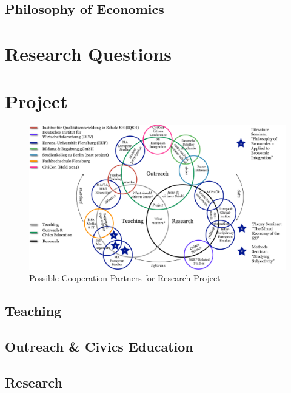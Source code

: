 \documentclass[11pt,a4paper,oneside,english]{article}
\begin{document}
\subsection[Philosophy of Economics]{Philosophy of Economics} \label{sec:philosophy-economics}

\section[Research Questions]{Research Questions} \label{sec:research-questions}

\section[Project]{Project} \label{sec:project}

\begin{landscape}
 \begin{figure}[htbp]
    \begin{center}
	\includegraphics[width=1\linewidth]{img/euf-partners}
	\caption{Possible Cooperation Partners for Research Project}
	\label{fig:euf-partners}
	\end{center}
\end{figure}
\end{landscape}

\subsection[Teaching]{Teaching} \label{sec:teaching}

\subsection[Outreach]{Outreach \& Civics Education} \label{sec:outreach}

\subsection[Research]{Research} \label{sec:research}
\end{document}
